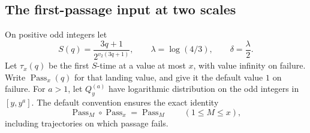 \subsection{The first-passage input at two scales}

On positive odd integers let
\[
 S(q)=\frac{3q+1}{2^{v_2(3q+1)}},\qquad
 \lambda=\log(4/3),\qquad \delta=\frac{\lambda}{2}.
\]
Let \(\tau_x(q)\) be the first \(S\)-time at a value at most \(x\),
with value infinity on failure. Write \(\operatorname{Pass}_x(q)\)
for that landing value, and give it the default value \(1\) on
failure. For \(a>1\), let \(Q_y^{(a)}\) have logarithmic
distribution on the odd integers in \([y,y^a]\).
The default convention ensures the exact identity
\begin{equation}\label{eq:ct-pass-compose}
 \operatorname{Pass}_M\circ\operatorname{Pass}_x
 =\operatorname{Pass}_M\qquad(1\le M\le x),
\end{equation}
including trajectories on which passage fails.

